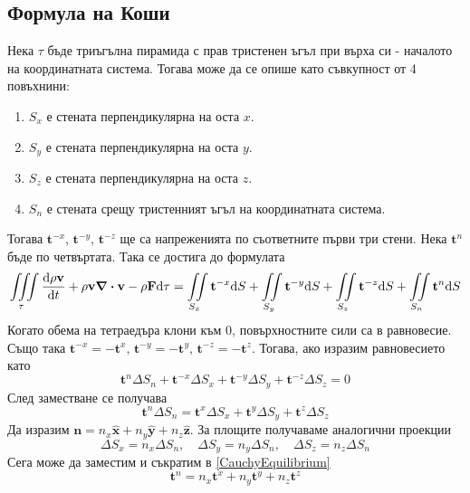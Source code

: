 \subsection{Формула на Коши}
Нека $\tau$ бъде триъгълна пирамида с прав тристенен ъгъл при върха си - началото на координатната система.
Тогава може да се опише като съвкупност от 4 повъхнини:
\begin{enumerate}
	\item $S_x$ е стената перпендикулярна на оста $x$.
	\item $S_y$ е стената перпендикулярна на оста $y$.
	\item $S_z$ е стената перпендикулярна на оста $z$.
	\item $S_n$ е стената срещу тристенният ъгъл на координатната система.
\end{enumerate}
Тогава $\mathbf{t}^{-x}$, $\mathbf{t}^{-y}$, $\mathbf{t}^{-z}$ ще са напреженията по съответните първи три стени.
Нека $\mathbf{t}^{n}$ бъде по четвъртата. Така се достига до формулата
\begin{equation}
	\iiint\limits_{\tau} \dv{\rho \mathbf{v}}{t} + \rho \mathbf{v} \div \mathbf{v} - \rho \mathbf{F} \dd \tau =
	\iint\limits_{S_x} \mathbf{t}^{-x} \dd S + \iint\limits_{S_y} \mathbf{t}^{-y} \dd S + \iint\limits_{S_z} \mathbf{t}^{-z} \dd S + \iint\limits_{S_n} \mathbf{t}^{n} \dd S
\end{equation}
Когато обема на тетраедъра клони към $0$, повърхностните сили са в равновесие.
Също така $\mathbf{t}^{-x} = - \mathbf{t}^{x},\, \mathbf{t}^{-y} = - \mathbf{t}^{y},\, \mathbf{t}^{-z} = - \mathbf{t}^{z}$.
Тогава, ако изразим равновесието като
\begin{equation}
	\mathbf{t}^{n} \Delta S_n + \mathbf{t}^{-x} \Delta S_x + \mathbf{t}^{-y} \Delta S_y + \mathbf{t}^{-z} \Delta S_z = 0
\end{equation}
След заместване се получава
\begin{equation}
	\label{CauchyEquilibrium} \mathbf{t}^{n} \Delta S_n = \mathbf{t}^{x} \Delta S_x + \mathbf{t}^{y} \Delta S_y + \mathbf{t}^{z} \Delta S_z
\end{equation}
Да изразим $\mathbf{n} = n_x \hat{\mathbf{x}} + n_y \hat{\mathbf{y}} + n_z \hat{\mathbf{z}}$.
За площите получаваме аналогични проекции
\begin{equation}
	\Delta S_x = n_x \Delta S_n,\quad \Delta S_y = n_y \Delta S_n,\quad \Delta S_z = n_z \Delta S_n
\end{equation}
Сега може да заместим и съкратим в \eqref{CauchyEquilibrium}
\begin{equation}
	\mathbf{t}^{n} = n_x \mathbf{t}^{x} + n_y \mathbf{t}^{y} + n_z \mathbf{t}^{z}
\end{equation}
